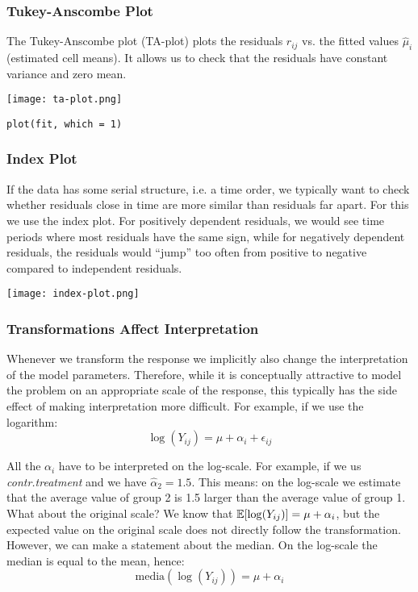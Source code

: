 \subsubsection{Tukey-Anscombe Plot}

The Tukey-Anscombe plot (TA-plot) plots the residuals $r_{ij}$ vs. the fitted values $\hat \mu_i$ (estimated cell means). It allows us to check that the residuals have constant variance and zero mean.
\begin{center}
	\texttt{[image: ta-plot.png]}
\end{center}
\begin{lstlisting}
plot(fit, which = 1)
\end{lstlisting}

\subsubsection{Index Plot}

If the data has some serial structure, i.e. a time order, we typically want to check whether residuals close in time are more similar than residuals far apart. For this we use the index plot. For positively dependent residuals, we would see time periods where most residuals have the same sign, while for negatively dependent residuals, the residuals would “jump” too often from positive to negative compared to independent residuals.
\\[-15pt]
\begin{center}
	\texttt{[image: index-plot.png]}
\end{center}


\subsubsection{Transformations Affect Interpretation}

Whenever we transform the response we implicitly also change the interpretation of the model parameters. Therefore, while it is conceptually attractive to model the problem on an appropriate scale of the response, this typically has the side effect of making interpretation more difficult. For example, if we use the logarithm:
$$\log (Y_{ij}) = \mu + \alpha_i + \epsilon_{ij}$$

All the $\alpha_i$ have to be interpreted on the log-scale. For example, if we us \textit{contr.treatment} and we have $\hat \alpha_2 = 1.5$. This means: on the log-scale we estimate that the average value of group 2 is 1.5 larger than the average value of group 1. What about the original scale? We know that $\mathbb{E}[\log(Y_{ij})] = \mu + \alpha_i$, but the expected value on the original scale does not directly follow the transformation. However, we can make a statement about the median. On the log-scale the median is equal to the mean, hence:
$$\text{media}(\log(Y_{ij})) = \mu + \alpha_i$$

